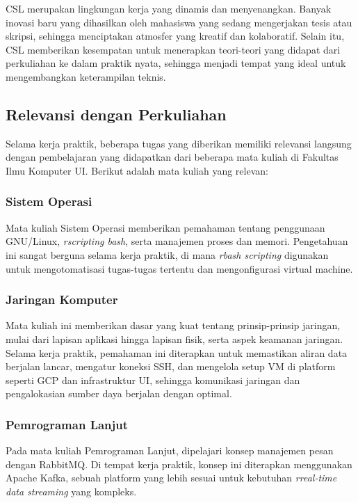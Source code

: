 CSL merupakan lingkungan kerja yang dinamis dan menyenangkan. Banyak inovasi baru yang dihasilkan oleh mahasiswa yang sedang mengerjakan tesis atau skripsi, sehingga menciptakan atmosfer yang kreatif dan kolaboratif. Selain itu, CSL memberikan kesempatan untuk menerapkan teori-teori yang didapat dari perkuliahan ke dalam praktik nyata, sehingga menjadi tempat yang ideal untuk mengembangkan keterampilan teknis.

\subsection{Relevansi dengan Perkuliahan}

Selama kerja praktik, beberapa tugas yang diberikan memiliki relevansi langsung dengan pembelajaran yang didapatkan dari beberapa mata kuliah di Fakultas Ilmu Komputer UI. Berikut adalah mata kuliah yang relevan:

\subsubsection{Sistem Operasi}
Mata kuliah Sistem Operasi memberikan pemahaman tentang penggunaan GNU/Linux, \textit{rscripting bash}, serta manajemen proses dan memori. Pengetahuan ini sangat berguna selama kerja praktik, di mana \textit{rbash scripting} digunakan untuk mengotomatisasi tugas-tugas tertentu dan mengonfigurasi virtual machine.

\subsubsection{Jaringan Komputer}
Mata kuliah ini memberikan dasar yang kuat tentang prinsip-prinsip jaringan, mulai dari lapisan aplikasi hingga lapisan fisik, serta aspek keamanan jaringan. Selama kerja praktik, pemahaman ini diterapkan untuk memastikan aliran data berjalan lancar, mengatur koneksi SSH, dan mengelola setup VM di platform seperti GCP dan infrastruktur UI, sehingga komunikasi jaringan dan pengalokasian sumber daya berjalan dengan optimal.

\subsubsection{Pemrograman Lanjut}
Pada mata kuliah Pemrograman Lanjut, dipelajari konsep manajemen pesan dengan RabbitMQ. Di tempat kerja praktik, konsep ini diterapkan menggunakan Apache Kafka, sebuah platform yang lebih sesuai untuk kebutuhan \textit{rreal-time data streaming} yang kompleks.
